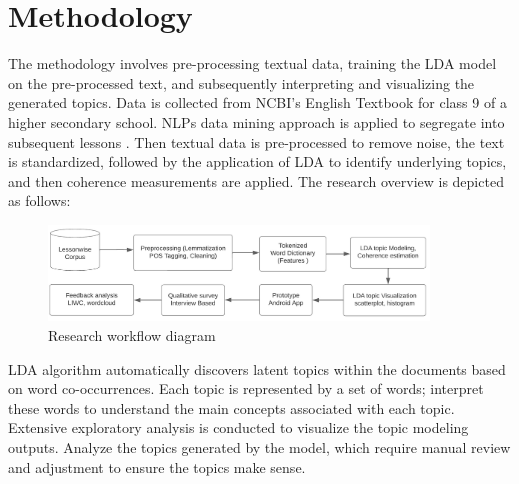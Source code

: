 \documentclass[sn-mathphys,Numbered]{sn-jnl}%
\theoremstyle{thmstyleone}%
\theoremstyle{thmstyletwo}%
\theoremstyle{thmstylethree}%
\begin{document}
\section{Methodology}\label{methods} 
The methodology involves pre-processing textual data, training the LDA model on the pre-processed text, and subsequently interpreting and visualizing the generated topics. Data is collected from NCBI's English Textbook for class 9 of a higher secondary school. NLPs data mining approach is applied to segregate into subsequent lessons \cite{kao_natural_2007, mccarthy_applied_2012}. Then textual data is pre-processed to remove noise, the text is standardized, followed by the application of LDA to identify underlying topics, and then coherence measurements are applied. The research overview is depicted as follows:

\begin{figure}[h!]
\centering
\includegraphics[width=0.9\textwidth]{methodology.png}
\caption{Research workflow diagram}
\end{figure}

LDA algorithm automatically discovers latent topics within the documents based on word co-occurrences. Each topic is represented by a set of words; interpret these words to understand the main concepts associated with each topic. Extensive exploratory analysis is conducted to visualize the topic modeling outputs. Analyze the topics generated by the model, which require manual review and adjustment to ensure the topics make sense.\\
\end{document}
